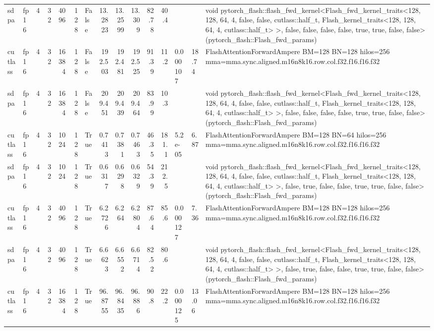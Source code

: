 \begin{table}[htbp]
\begin{tabular}{llrrrrlrrrrrlll}
    sdpa & fp16 & 4 & 32 & 4096 & 128 & False & 13.2823 & 13.2599 & 13.309 & 82.78 & 40.4 &  &  & void pytorch\_flash::flash\_fwd\_kernel<Flash\_fwd\_kernel\_traits<128, 128, 64, 4, false, false, cutlass::half\_t, Flash\_kernel\_traits<128, 128, 64, 4, cutlass::half\_t> >, false, false, false, false, true, true, false, false>(pytorch\_flash::Flash\_fwd\_params) \\
    cutlass & fp16 & 4 & 32 & 16384 & 128 & False & 192.503 & 192.481 & 192.525 & 91.39 & 11.2 & 0.000107 & 18.74 & FlashAttentionForwardAmpere BM=128 BN=128 hilos=256 mma=mma.sync.aligned.m16n8k16.row.col.f32.f16.f16.f32 \\
    sdpa & fp16 & 4 & 32 & 16384 & 128 & False & 209.451 & 209.439 & 209.464 & 83.99 & 10.3 &  &  & void pytorch\_flash::flash\_fwd\_kernel<Flash\_fwd\_kernel\_traits<128, 128, 64, 4, false, false, cutlass::half\_t, Flash\_kernel\_traits<128, 128, 64, 4, cutlass::half\_t> >, false, false, false, false, true, true, false, false>(pytorch\_flash::Flash\_fwd\_params) \\
    cutlass & fp16 & 4 & 32 & 1024 & 128 & True & 0.7413 & 0.7381 & 0.7463 & 46.35 & 181.1 & 5.2e-05 & 6.87 & FlashAttentionForwardAmpere BM=128 BN=64 hilos=256 mma=mma.sync.aligned.m16n8k16.row.col.f32.f16.f16.f32 \\
    sdpa & fp16 & 4 & 32 & 1024 & 128 & True & 0.6317 & 0.6298 & 0.6329 & 54.39 & 212.5 &  &  & void pytorch\_flash::flash\_fwd\_kernel<Flash\_fwd\_kernel\_traits<128, 128, 64, 4, false, false, cutlass::half\_t, Flash\_kernel\_traits<128, 128, 64, 4, cutlass::half\_t> >, false, true, false, false, true, true, false, false>(pytorch\_flash::Flash\_fwd\_params) \\
    cutlass & fp16 & 4 & 32 & 4096 & 128 & True & 6.2726 & 6.264 & 6.2804 & 87.64 & 85.6 & 0.000127 & 7.36 & FlashAttentionForwardAmpere BM=128 BN=128 hilos=256 mma=mma.sync.aligned.m16n8k16.row.col.f32.f16.f16.f32 \\
    sdpa & fp16 & 4 & 32 & 4096 & 128 & True & 6.6623 & 6.6552 & 6.6714 & 82.52 & 80.6 &  &  & void pytorch\_flash::flash\_fwd\_kernel<Flash\_fwd\_kernel\_traits<128, 128, 64, 4, false, false, cutlass::half\_t, Flash\_kernel\_traits<128, 128, 64, 4, cutlass::half\_t> >, false, true, false, false, true, true, false, false>(pytorch\_flash::Flash\_fwd\_params) \\
    cutlass & fp16 & 4 & 32 & 16384 & 128 & True & 96.8755 & 96.8435 & 96.886 & 90.8 & 22.2 & 0.000125 & 13.06 & FlashAttentionForwardAmpere BM=128 BN=128 hilos=256 mma=mma.sync.aligned.m16n8k16.row.col.f32.f16.f16.f32 \\

\end{tabular}
\end{table}
